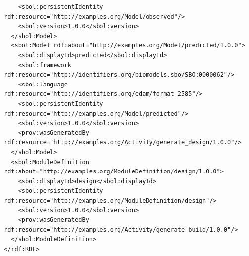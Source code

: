 \begin{lstlisting}
    <sbol:persistentIdentity rdf:resource="http://examples.org/Model/observed"/>
    <sbol:version>1.0.0</sbol:version>
  </sbol:Model>
  <sbol:Model rdf:about="http://examples.org/Model/predicted/1.0.0">
    <sbol:displayId>predicted</sbol:displayId>
    <sbol:framework rdf:resource="http://identifiers.org/biomodels.sbo/SBO:0000062"/>
    <sbol:language rdf:resource="http://identifiers.org/edam/format_2585"/>
    <sbol:persistentIdentity rdf:resource="http://examples.org/Model/predicted"/>
    <sbol:version>1.0.0</sbol:version>
    <prov:wasGeneratedBy rdf:resource="http://examples.org/Activity/generate_design/1.0.0"/>
  </sbol:Model>
  <sbol:ModuleDefinition rdf:about="http://examples.org/ModuleDefinition/design/1.0.0">
    <sbol:displayId>design</sbol:displayId>
    <sbol:persistentIdentity rdf:resource="http://examples.org/ModuleDefinition/design"/>
    <sbol:version>1.0.0</sbol:version>
    <prov:wasGeneratedBy rdf:resource="http://examples.org/Activity/generate_build/1.0.0"/>
  </sbol:ModuleDefinition>
</rdf:RDF>
\end{lstlisting}


